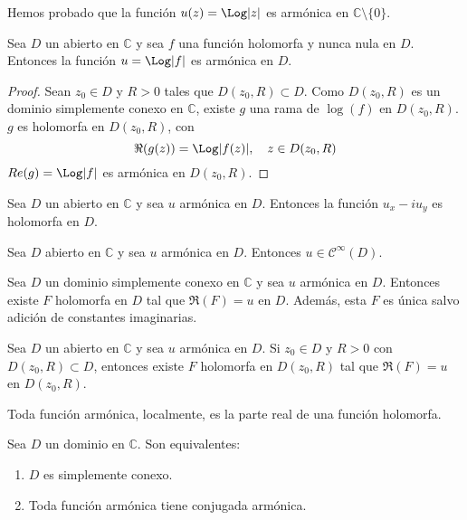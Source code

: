 Hemos probado que la función $u(z) = \Log|z|$ es armónica en $\mathbb{C} \setminus \{0\}$.

\begin{lemma}
    Sea $D$ un abierto en $\mathbb{C}$ y sea $f$ una función holomorfa y nunca nula en $D$.
    Entonces la función $u = \Log|f|$ es armónica en $D$.
\end{lemma}

\begin{proof}
    Sean $z_0 \in D$ y $R > 0$ tales que $D(z_0, R) \subset D$.
    Como $D(z_0, R)$ es un dominio simplemente conexo en $\mathbb{C}$, existe $g$ una rama de $\log(f)$ en $D(z_0, R)$.
    $g$ es holomorfa en $D(z_0, R)$, con
    $$\Re(g(z)) = \Log|f(z)|, \quad z \in D(z_0, R)$$
    $Re(g) = \Log|f|$ es armónica en $D(z_0, R)$.
\end{proof}

\begin{proposition}
    Sea $D$ un abierto en $\mathbb{C}$ y sea $u$ armónica en $D$.
    Entonces la función $u_x - iu_y$ es holomorfa en $D$.
\end{proposition}


\begin{corollary}
    Sea $D$ abierto en $\mathbb{C}$ y sea $u$ armónica en $D$.
    Entonces $u \in \mathcal{C}^\infty(D)$.
\end{corollary}


\begin{proposition}
    Sea $D$ un dominio simplemente conexo en $\mathbb{C}$ y sea $u$ armónica en $D$.
    Entonces existe $F$ holomorfa en $D$ tal que $\Re(F) = u$ en $D$.
    Además, esta $F$ es única salvo adición de constantes imaginarias.
\end{proposition}


\begin{corollary}
    Sea $D$ un abierto en $\mathbb{C}$ y sea $u$ armónica en $D$.
    Si $z_0 \in D$ y $R > 0$ con $D(z_0, R) \subset D$, entonces existe $F$ holomorfa en $D(z_0, R)$ tal que $\Re(F) = u$ en $D(z_0, R)$.
\end{corollary}

Toda función armónica, localmente, es la parte real de una función holomorfa.

\begin{theorem}
    Sea $D$ un dominio en $\mathbb{C}$.
    Son equivalentes:
    \begin{enumerate}
        \item $D$ es simplemente conexo.
        \item Toda función armónica tiene conjugada armónica.
    \end{enumerate}
\end{theorem}


